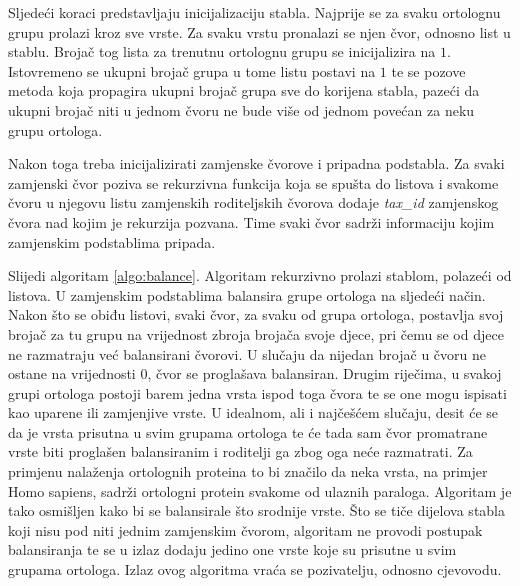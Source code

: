 Sljedeći koraci predstavljaju inicijalizaciju stabla. Najprije se za svaku
ortolognu grupu prolazi kroz sve vrste. Za svaku vrstu pronalazi se njen čvor,
odnosno list u stablu. Brojač tog lista za trenutnu ortolognu grupu se
inicijalizira na $1$. Istovremeno se ukupni brojač grupa u tome listu postavi na
$1$ te se pozove metoda koja propagira ukupni brojač grupa sve do korijena
stabla, pazeći da ukupni brojač niti u jednom čvoru ne bude više od jednom
povećan za neku grupu ortologa.

Nakon toga treba inicijalizirati zamjenske čvorove i pripadna podstabla. Za
svaki zamjenski čvor poziva se rekurzivna funkcija koja se spušta do listova i
svakome čvoru u njegovu listu zamjenskih roditeljskih čvorova dodaje
\emph{tax\_id} zamjenskog čvora nad kojim je rekurzija pozvana.  Time svaki čvor
sadrži informaciju kojim zamjenskim podstablima pripada.



Slijedi algoritam \ref{algo:balance}. Algoritam rekurzivno prolazi stablom,
polazeći od listova. U zamjenskim podstablima balansira grupe ortologa na
sljedeći način. Nakon što se obiđu listovi, svaki čvor, za svaku od grupa
ortologa, postavlja svoj brojač za tu grupu na vrijednost zbroja brojača svoje
djece, pri čemu se od djece ne razmatraju već balansirani čvorovi. U slučaju da
nijedan brojač u čvoru ne ostane na vrijednosti $0$, čvor se proglašava
balansiran. Drugim riječima, u svakoj grupi ortologa postoji barem jedna vrsta
ispod toga čvora te se one mogu ispisati kao uparene ili zamjenjive vrste.  U
idealnom, ali i najčešćem slučaju, desit će se da je vrsta prisutna u svim
grupama ortologa te će tada sam čvor promatrane vrste biti proglašen
balansiranim i roditelji ga zbog oga neće razmatrati. Za primjenu nalaženja
ortolognih proteina to bi značilo da neka vrsta, na primjer Homo sapiens, sadrži
ortologni protein svakome od ulaznih paraloga. Algoritam je tako osmišljen kako
bi se balansirale što srodnije vrste.  Što se tiče dijelova stabla koji nisu pod
niti jednim zamjenskim čvorom, algoritam ne provodi postupak balansiranja te se
u izlaz dodaju jedino one vrste koje su prisutne u svim grupama ortologa. Izlaz
ovog algoritma vraća se pozivatelju, odnosno cjevovodu.


